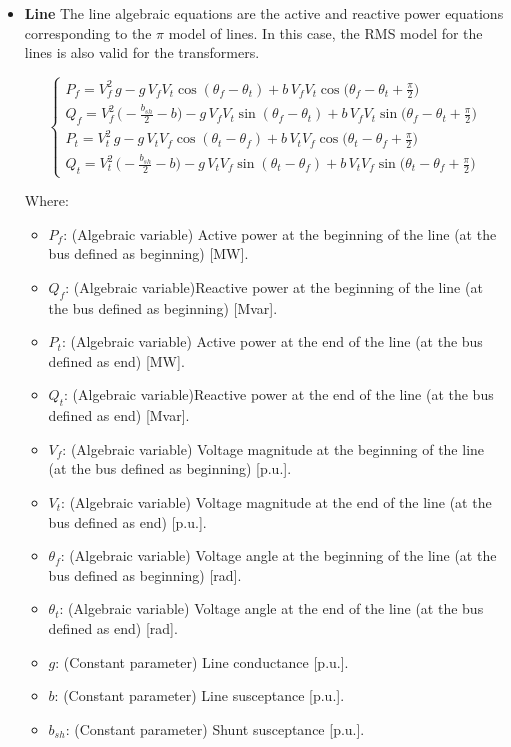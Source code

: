 \begin{itemize}

\item \textbf{Line}
The line algebraic equations are the active and reactive power equations corresponding to the $\pi$ model of lines.
In this case, the RMS model for the lines is also valid for the transformers.

\begin{equation}
\begin{cases}
P_f = V_{f}^2 \, g - g \, V_{f} V_{t} \cos(\theta_{f} - \theta_{t}) + b \, V_{f} V_{t} \cos\Big(\theta_{f} - \theta_{t} + \frac{\pi}{2}\Big) \\
Q_f = V_{f}^2 \, \Big(-\frac{b_{sh}}{2} - b \Big) - g \, V_{f} V_{t} \sin(\theta_{f} - \theta_{t}) + b \, V_{f} V_{t} \sin\Big(\theta_{f} - \theta_{t} + \frac{\pi}{2}\Big) \\
P_t = V_{t}^2 \, g - g \, V_{t} V_{f} \cos(\theta_{t} - \theta_{f}) + b \, V_{t} V_{f} \cos\Big(\theta_{t} - \theta_{f} + \frac{\pi}{2}\Big) \\
Q_t = V_{t}^2 \, \Big(-\frac{b_{sh}}{2} - b \Big) - g \, V_{t} V_{f} \sin(\theta_{t} - \theta_{f}) + b \, V_{t} V_{f} \sin\Big(\theta_{t} - \theta_{f} + \frac{\pi}{2}\Big)
\end{cases}
\label{eq:alg_eq_line}
\end{equation}

Where:
\begin{itemize}
  \item $P_{f}$: (Algebraic variable) Active power at the beginning of the line (at the bus defined as beginning) [MW].
  \item $Q_{f}$: (Algebraic variable)Reactive power at the beginning of the line (at the bus defined as beginning) [Mvar].
  \item $P_{t}$: (Algebraic variable) Active power at the end of the line (at the bus defined as end) [MW].
  \item $Q_{t}$: (Algebraic variable)Reactive power at the end of the line (at the bus defined as end) [Mvar].
  \item $V_f$: (Algebraic variable) Voltage magnitude at the beginning of the line (at the bus defined as beginning) [p.u.].
  \item $V_t$: (Algebraic variable) Voltage magnitude at the end of the line (at the bus defined as end) [p.u.].
  \item $\theta_f$: (Algebraic variable) Voltage angle at the beginning of the line (at the bus defined as beginning) [rad].
  \item $\theta_t$: (Algebraic variable) Voltage angle at the end of the line (at the bus defined as end) [rad].
  \item $g$: (Constant parameter) Line conductance [p.u.].
  \item $b$: (Constant parameter) Line susceptance [p.u.].
  \item $b_{sh}$: (Constant parameter) Shunt susceptance [p.u.].
\end{itemize}

\end{itemize}

